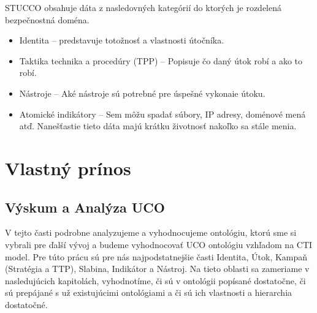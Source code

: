 \documentclass[12pt, a4paper, oneside]{book}
\begin{document}
STUCCO obsahuje dáta z nasledovných kategórií do ktorých je rozdelená bezpečnostná doména. 
\begin{itemize}
\item Identita -- predstavuje totožnosť a vlastnosti útočníka.
\item Taktika technika a procedúry (TPP) -- Popisuje čo daný útok robí a ako to robí.
\item Nástroje -- Aké nástroje sú potrebné pre úspešné vykonaie útoku.
\item Atomické indikátory -- Sem môžu spadať súbory, IP adresy, doménové mená atď. Nanešťastie tieto dáta majú krátku životnosť nakoľko sa stále menia.
\end{itemize}


\part{Vlastný prínos}
\chapter{Výskum a Analýza UCO}

V tejto časti podrobne analyzujeme a vyhodnocujeme ontológiu\citep{ucoSource}, ktorú sme si vybrali pre ďalší vývoj a budeme vyhodnocovať UCO ontológiu vzhľadom na CTI model. Pre túto prácu sú pre nás najpodstatnejšie časti Identita, Útok, Kampaň (Stratégia a TTP), Slabina, Indikátor a Nástroj. Na tieto oblasti sa zameriame v nasledujúcich kapitolách, vyhodnotíme, či sú v ontológii popísané dostatočne, či sú prepájané s už existujúcimi ontológiami a či sú ich vlastnosti a hierarchia dostatočné. 
\end{document}
